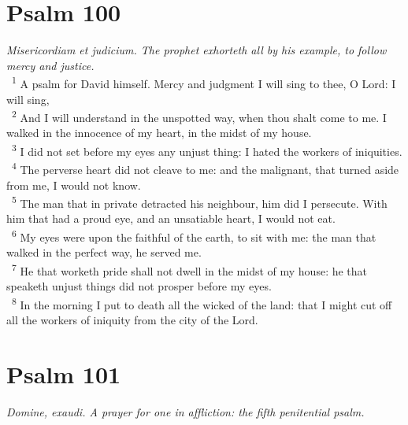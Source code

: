 \documentclass[a5paper,12pt]{article}
\begin{document}
\begin{multicols*}{2}
\section{Psalm 100}
\label{sec:orga1fad7d}
\emph{Misericordiam et judicium. The prophet exhorteth all by his example, to follow mercy and justice.}\\

~\textsuperscript{1} A psalm for David himself. Mercy and judgment I will sing to thee, O Lord: I will sing,\\
~\textsuperscript{2} And I will understand in the unspotted way, when thou shalt come to me. I walked in the innocence of my heart, in the midst of my house.\\
~\textsuperscript{3} I did not set before my eyes any unjust thing: I hated the workers of iniquities.\\
~\textsuperscript{4} The perverse heart did not cleave to me: and the malignant, that turned aside from me, I would not know.\\
~\textsuperscript{5} The man that in private detracted his neighbour, him did I persecute. With him that had a proud eye, and an unsatiable heart, I would not eat.\\
~\textsuperscript{6} My eyes were upon the faithful of the earth, to sit with me: the man that walked in the perfect way, he served me.\\
~\textsuperscript{7} He that worketh pride shall not dwell in the midst of my house: he that speaketh unjust things did not prosper before my eyes.\\
~\textsuperscript{8} In the morning I put to death all the wicked of the land: that I might cut off all the workers of iniquity from the city of the Lord.\\

\section{Psalm 101}
\label{sec:orgc8f98e2}
\emph{Domine, exaudi. A prayer for one in affliction: the fifth penitential psalm.}\\


\end{multicols*}
\end{document}
